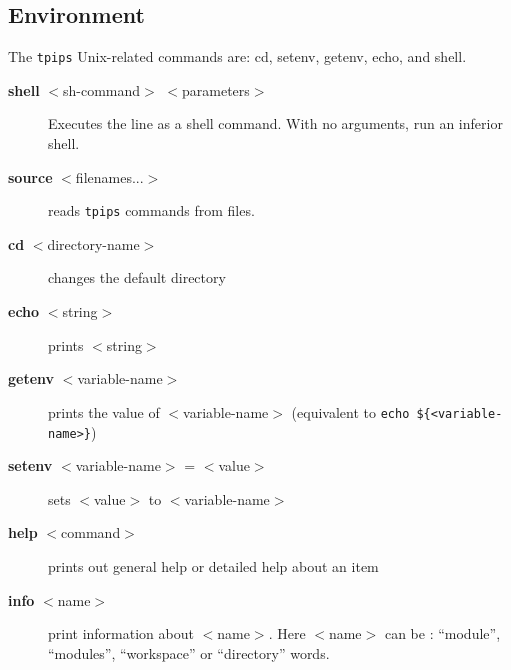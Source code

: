 \documentclass[a4paper,12pt]{article}
\begin{document}
\subsection{Environment}
The {\tt tpips} Unix-related commands are: cd, setenv, getenv, echo, and
shell.

\begin{description}
  
\item [ {\bf shell} $<$sh-command$>$ $<$parameters$>$] Executes the line
  as a shell command. With no arguments, run an inferior shell.
  
\item [ {\bf source} $<$filenames...$>$] reads {\tt tpips} commands from
  files.
  
\item [ {\bf cd} $<$directory-name$>$] changes the default directory
  

\item [ {\bf echo} $<$string$>$] prints $<$string$>$

\item [ {\bf getenv} $<$variable-name$>$] prints the value of $<$variable-name$>$ (equivalent to \verb+echo ${<variable-name>}+)
\item  [ {\bf setenv} $<$variable-name$>$ = $<$value$>$] sets $<$value$>$ to $<$variable-name$>$


\item [ {\bf help} $<$command$>$] prints out general help or detailed help
  about an item

\item [{\bf info} $<$name$>$]  print information about $<$name$>$. Here 
        $<$name$>$ can be :  ``module'', ``modules'', ``workspace'' or 
        ``directory'' words. 

\end{description}
  
\end{document}
